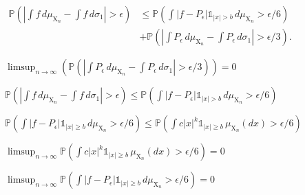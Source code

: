 



\begin{lemma}
    \label{lem:reestimate}
    $\begin{align*} \mathbb{P}\left( \left|\int f\,d\mu_{\mathrm{X}_n} - \int f\,d\sigma_1\right|>\epsilon\right) &\le \mathbb{P}\left(\int |f-P_\epsilon|\mathbb{1}_{|x|> b}\,d\mu_{\mathrm{X}_n}>\epsilon/6\right) \\ 
     &+ \mathbb{P}\left(\left|\int P_\epsilon\,d\mu_{\mathrm{X}_n} - \int P_\epsilon\,d\sigma_1\right| >\epsilon/3\right).
     \end{align*}$
\end{lemma}


\begin{lemma}
    \label{lem:second_term_estimate}
    \uses{} %
    \notready
    $ \limsup_{n \to \infty} \left(\mathbb{P}\left(\left|\int P_\epsilon\,d\mu_{\mathrm{X}_n} - \int P_\epsilon\,d\sigma_1\right| >\epsilon/3\right) \right) = 0 $

\end{lemma}



\begin{lemma}
    \label{lem:final_estimate}
    $\mathbb{P}\left( \left|\int f\,d\mu_{\mathrm{X}_n} - \int f\,d\sigma_1\right|>\epsilon\right) \leq \mathbb{P}\left(\int |f-P_\epsilon|\mathbb{1}_{|x|> b}\,d\mu_{\mathrm{X}_n}>\epsilon/6\right)$
\end{lemma}



\begin{lemma}  
    \label{lem:polynomial_ineq}
    \uses{}
    $ \mathbb{P}\left(\int |f-P_\epsilon| \mathbb{1}_{|x|\ge b}\,d\mu_{\mathrm{X}_n} > \epsilon/6\right) \le \mathbb{P}\left(\int c|x|^k\mathbb{1}_{|x|\ge b}\,\mu_{\mathrm{X}_n}(dx) > \epsilon/6\right) $

\end{lemma}


\begin{lemma}
    \label{lem:fP_bound}
    \uses{}
    $\limsup_{n \to \infty}\mathbb{P}\left(\int c|x|^k\mathbb{1}_{|x|\ge b}\,\mu_{\mathrm{X}_n}(dx) > \epsilon/6\right) = 0 $
\end{lemma}


\begin{lemma}
    \label{lem:fP_zero}
    \notready
    $\limsup_{n \to \infty}  \mathbb{P}\left(\int |f-P_\epsilon| \mathbb{1}_{|x|\ge b}\,d\mu_{\mathrm{X}_n} > \epsilon/6\right) = 0$
\end{lemma}